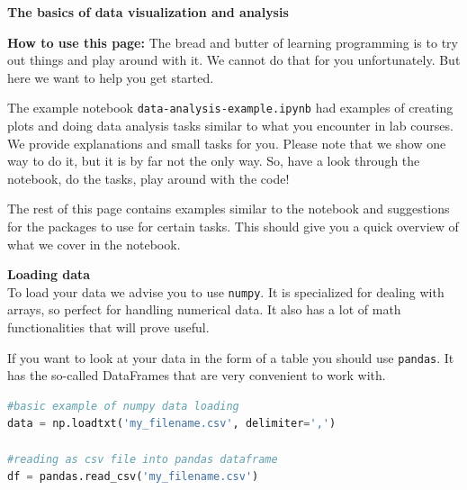 \documentclass{article}
\begin{document}
\nocite{reference}
\printbibliography[keyword={data-analysis}, title=\normalsize References]


 \newpage

\begin{center}

\textbf{ \Large The basics of data visualization and analysis}

\end{center}

\textbf{How to use this page:} The bread and butter of learning programming is to try out things and play around with it. We cannot do that for you unfortunately. But here we want to help you get started. 

The example notebook \lstinline{data-analysis-example.ipynb} had examples of creating plots and doing data analysis tasks similar to what you encounter in lab courses. We provide explanations and small tasks for you. Please note that we show one way to do it, but it is by far not the only way. So, have a look through the notebook, do the tasks, play around with the code! 

The rest of this page contains examples similar to the notebook and suggestions for the packages to use for certain tasks. This should give you a quick overview of what we cover in the notebook.

\dotfill
\vspace{5pt}

\noindent
\begin{minipage}{.5\textwidth}
\textbf{\large Loading data}\\
To load your data we advise you to use \lstinline{numpy}. It is specialized for dealing with arrays, so perfect for handling numerical data. It also has a lot of math functionalities that will prove useful.

If you want to look at your data in the form of a table you should use \lstinline{pandas}. It has the so-called DataFrames that are very convenient to work with. 

\end{minipage}%
\hspace{.05\textwidth}\begin{minipage}{.5\textwidth}
\begin{lstlisting}[language=python, numbers=none]   
#basic example of numpy data loading
data = np.loadtxt('my_filename.csv', delimiter=',')

#reading as csv file into pandas dataframe
df = pandas.read_csv('my_filename.csv')
    
\end{lstlisting}
\end{minipage}
\end{document}
